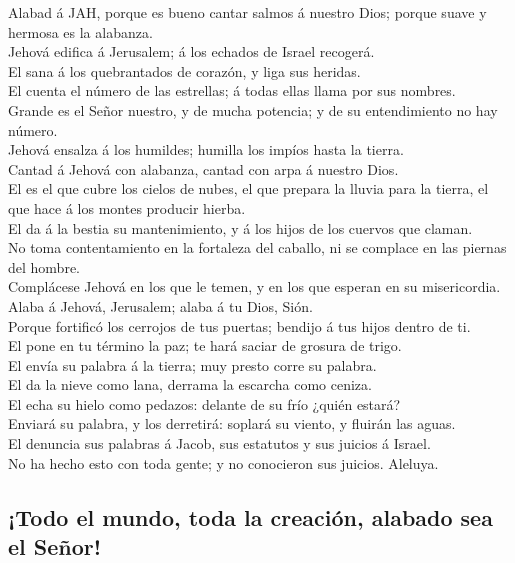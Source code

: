  Alabad á JAH, porque es bueno cantar salmos á nuestro Dios;
porque suave y hermosa es la alabanza.\\
 Jehová edifica á Jerusalem; á los echados de Israel
recogerá.\\
 El sana á los quebrantados de corazón, y liga sus
heridas.\\
 El cuenta el número de las estrellas; á todas ellas llama
por sus nombres.\\
 Grande es el Señor nuestro, y de mucha potencia; y de su
entendimiento no hay número.\\
 Jehová ensalza á los humildes; humilla los impíos hasta la
tierra.\\
 Cantad á Jehová con alabanza, cantad con arpa á nuestro
Dios.\\
 El es el que cubre los cielos de nubes, el que prepara la
lluvia para la tierra, el que hace á los montes producir hierba.\\
 El da á la bestia su mantenimiento, y á los hijos de los
cuervos que claman.\\
 No toma contentamiento en la fortaleza del caballo, ni se
complace en las piernas del hombre.\\
 Complácese Jehová en los que le temen, y en los que
esperan en su misericordia.\\
 Alaba á Jehová, Jerusalem; alaba á tu Dios, Sión.\\
 Porque fortificó los cerrojos de tus puertas; bendijo á
tus hijos dentro de ti.\\
 El pone en tu término la paz; te hará saciar de grosura de
trigo.\\
 El envía su palabra á la tierra; muy presto corre su
palabra.\\
 El da la nieve como lana, derrama la escarcha como
ceniza.\\
 El echa su hielo como pedazos: delante de su frío ¿quién
estará?\\
 Enviará su palabra, y los derretirá: soplará su viento, y
fluirán las aguas.\\
 El denuncia sus palabras á Jacob, sus estatutos y sus
juicios á Israel.\\
 No ha hecho esto con toda gente; y no conocieron sus
juicios. Aleluya.

\hypertarget{todo-el-mundo-toda-la-creaciuxf3n-alabado-sea-el-seuxf1or}{%
\subsection{¡Todo el mundo, toda la creación, alabado sea el
Señor!}\label{todo-el-mundo-toda-la-creaciuxf3n-alabado-sea-el-seuxf1or}}

